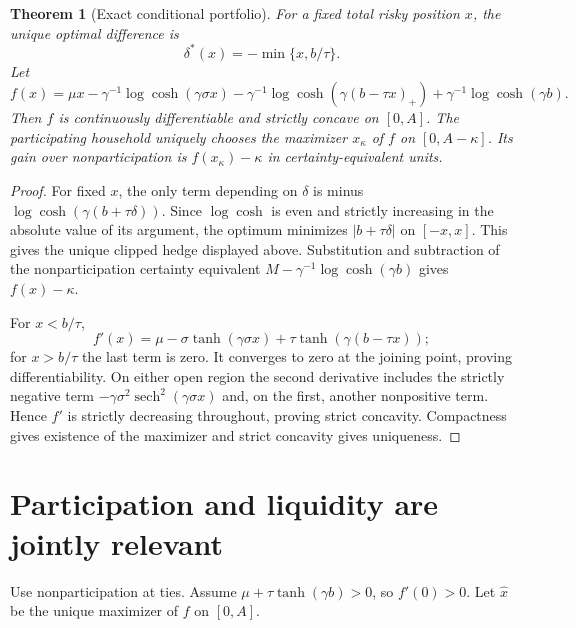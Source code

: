 \documentclass[11pt,a4paper]{article}
\newtheorem{theorem}{Theorem}[section]
\theoremstyle{definition}
\theoremstyle{remark}
\begin{document}
\begin{theorem}[Exact conditional portfolio]
For a fixed total risky position $x$, the unique optimal difference is
\[
 \delta^*(x)=-\min\{x,b/\tau\}.
\]
Let
\[
 f(x)=\mu x-\gamma^{-1}\log\cosh(\gamma\sigma x)
 -\gamma^{-1}\log\cosh(\gamma(b-\tau x)_+)
 +\gamma^{-1}\log\cosh(\gamma b).
\]
Then $f$ is continuously differentiable and strictly concave on $[0,A]$. The participating household uniquely chooses the maximizer $x_\kappa$ of $f$ on $[0,A-\kappa]$. Its gain over nonparticipation is $f(x_\kappa)-\kappa$ in certainty-equivalent units.
\end{theorem}
\begin{proof}
For fixed $x$, the only term depending on $\delta$ is minus $\log\cosh(\gamma(b+\tau\delta))$. Since $\log\cosh$ is even and strictly increasing in the absolute value of its argument, the optimum minimizes $|b+\tau\delta|$ on $[-x,x]$. This gives the unique clipped hedge displayed above. Substitution and subtraction of the nonparticipation certainty equivalent $M-\gamma^{-1}\log\cosh(\gamma b)$ gives $f(x)-\kappa$.

For $x<b/\tau$,
\[
 f'(x)=\mu-\sigma\tanh(\gamma\sigma x)+\tau\tanh(\gamma(b-\tau x));
\]
for $x>b/\tau$ the last term is zero. It converges to zero at the joining point, proving differentiability. On either open region the second derivative includes the strictly negative term $-\gamma\sigma^2\operatorname{sech}^2(\gamma\sigma x)$ and, on the first, another nonpositive term. Hence $f'$ is strictly decreasing throughout, proving strict concavity. Compactness gives existence of the maximizer and strict concavity gives uniqueness.
\end{proof}

\section{Participation and liquidity are jointly relevant}
Use nonparticipation at ties. Assume $\mu+\tau\tanh(\gamma b)>0$, so $f'(0)>0$. Let $\hat x$ be the unique maximizer of $f$ on $[0,A]$.
\end{document}
